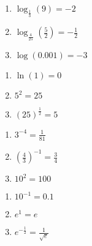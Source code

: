 \documentclass{ximera}
\begin{document}
\begin{multicols}{3}
\begin{enumerate}
\setcounter{enumi}{\value{HW}}


\item  $\log_{\frac{1}{3}}(9) = -2$

\item  $\log_{\frac{4}{25}}\left(\frac{5}{2}\right) = -\frac{1}{2}$

\item  $\log(0.001) = -3$

\setcounter{HW}{\value{enumi}}
\end{enumerate}
\end{multicols}

\begin{multicols}{3}
\begin{enumerate}
\setcounter{enumi}{\value{HW}}


\item  $\ln(1) = 0$

\item  $5^{2} = 25$

\item  $(25)^{\frac{1}{2}} = 5$

\setcounter{HW}{\value{enumi}}
\end{enumerate}
\end{multicols}

\begin{multicols}{3}
\begin{enumerate}
\setcounter{enumi}{\value{HW}}


\item  $3^{-4} = \frac{1}{81}$

\item  $\left(\frac{4}{3} \right)^{-1} = \frac{3}{4}$

\item  $10^{2} = 100$

\setcounter{HW}{\value{enumi}}
\end{enumerate}
\end{multicols}

\begin{multicols}{3}
\begin{enumerate}
\setcounter{enumi}{\value{HW}}


\item  $10^{-1} = 0.1$

\item  $e^{1} = e$

\item  $e^{-\frac{1}{2}} = \frac{1}{\sqrt{e}}$

\setcounter{HW}{\value{enumi}}
\end{enumerate}
\end{multicols}
\end{document}
